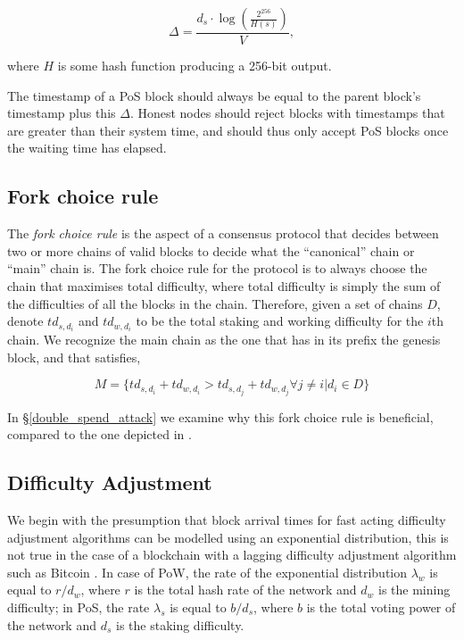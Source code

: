 $$\Delta = \frac{d_s \cdot \log (\frac{2^{256}}{H(s)})}{V},$$

where $H$ is some hash function producing a 256-bit output.

The timestamp of a PoS block should always be equal to the parent block's timestamp plus this $\Delta$. Honest nodes should reject blocks with timestamps that are greater than their system time, and should thus only accept PoS blocks once the waiting time has elapsed.

\subsection{Fork choice rule}
\label{fork}

The \emph{fork choice rule} is the aspect of a consensus protocol that decides between two or more chains of valid blocks to decide what the ``canonical'' chain or ``main'' chain is. The fork choice rule for the protocol is to always choose the chain that maximises total difficulty, where total difficulty is simply the sum of the difficulties of all the blocks in the chain. Therefore, given a set of chains $D$, denote $td_{s, d_i}$ and $td_{w, d_i}$ to be the total staking and working difficulty for the $i$th chain. We recognize the main chain as the one that has in its prefix the genesis block, and that satisfies,

\begin{equation}
    M = \{td_{s, d_i} + td_{w, d_i} > td_{s, d_j} + td_{w, d_j} \forall j \neq i | d_i \in D \}
\end{equation}

In \S\ref{double_spend_attack} we examine why this fork choice rule is beneficial, compared to the one depicted in \cite{wu2019unifying}.

\subsection{Difficulty Adjustment}
\label{difficulty_adjustment}

We begin with the presumption that block arrival times for fast acting difficulty adjustment algorithms can be modelled using an exponential distribution, this is not true in the case of a blockchain with a lagging difficulty adjustment algorithm such as Bitcoin \cite{block_arrivals}. In case of PoW, the rate of the exponential distribution $\lambda_w$ is equal to $r/d_w$, where $r$ is the total hash rate of the network and $d_w$ is the mining difficulty; in PoS, the rate $\lambda_s$ is equal to $b/d_s$, where $b$ is the total voting power of the network and $d_s$ is the staking difficulty.

